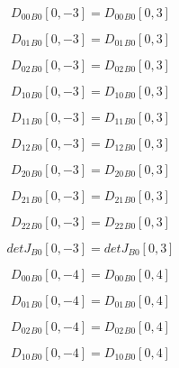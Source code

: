 \documentclass{article}
\begin{document}
\begin{dmath}{D_{00}{_{B0}}}[{0,-3}] = {D_{00}{_{B0}}}[{0,3}]\end{dmath}

\begin{dmath}{D_{01}{_{B0}}}[{0,-3}] = {D_{01}{_{B0}}}[{0,3}]\end{dmath}

\begin{dmath}{D_{02}{_{B0}}}[{0,-3}] = {D_{02}{_{B0}}}[{0,3}]\end{dmath}

\begin{dmath}{D_{10}{_{B0}}}[{0,-3}] = {D_{10}{_{B0}}}[{0,3}]\end{dmath}

\begin{dmath}{D_{11}{_{B0}}}[{0,-3}] = {D_{11}{_{B0}}}[{0,3}]\end{dmath}

\begin{dmath}{D_{12}{_{B0}}}[{0,-3}] = {D_{12}{_{B0}}}[{0,3}]\end{dmath}

\begin{dmath}{D_{20}{_{B0}}}[{0,-3}] = {D_{20}{_{B0}}}[{0,3}]\end{dmath}

\begin{dmath}{D_{21}{_{B0}}}[{0,-3}] = {D_{21}{_{B0}}}[{0,3}]\end{dmath}

\begin{dmath}{D_{22}{_{B0}}}[{0,-3}] = {D_{22}{_{B0}}}[{0,3}]\end{dmath}

\begin{dmath}{detJ{_{B0}}}[{0,-3}] = {detJ{_{B0}}}[{0,3}]\end{dmath}

\begin{dmath}{D_{00}{_{B0}}}[{0,-4}] = {D_{00}{_{B0}}}[{0,4}]\end{dmath}

\begin{dmath}{D_{01}{_{B0}}}[{0,-4}] = {D_{01}{_{B0}}}[{0,4}]\end{dmath}

\begin{dmath}{D_{02}{_{B0}}}[{0,-4}] = {D_{02}{_{B0}}}[{0,4}]\end{dmath}

\begin{dmath}{D_{10}{_{B0}}}[{0,-4}] = {D_{10}{_{B0}}}[{0,4}]\end{dmath}
\end{document}
